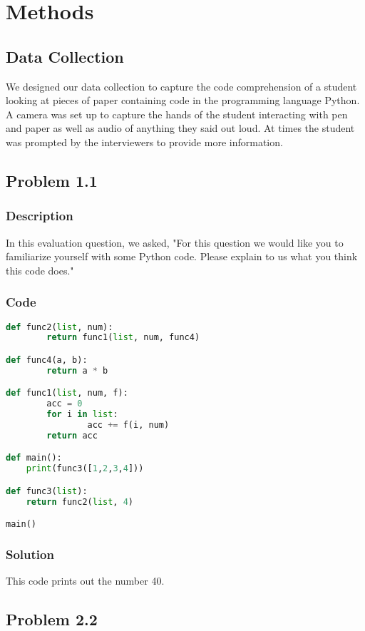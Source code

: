 \documentclass{article}
\begin{document}
\section{Methods}

\subsection{Data Collection}
We designed our data collection to capture the code comprehension of a student looking at pieces of paper containing code in the programming language Python. A camera was set up to capture the hands of the student interacting with pen and paper as well as audio of anything they said out loud. At times the student was prompted by the interviewers to provide more information. 

\subsection{Problem 1.1}
\subsubsection{Description}
In this evaluation question, we asked, "For this question we would like you to familiarize yourself with some Python code. Please explain to us what you think this code does." 
\subsubsection{Code}
\begin{lstlisting}[language=python]
def func2(list, num):
		return func1(list, num, func4)

def func4(a, b):
		return a * b

def func1(list, num, f):
		acc = 0
		for i in list:
				acc += f(i, num)
		return acc

def main():
	print(func3([1,2,3,4]))

def func3(list):
	return func2(list, 4)

main()

\end{lstlisting}
\subsubsection{Solution}
This code prints out the number 40.
\subsection{Problem 2.2}
\end{document}
